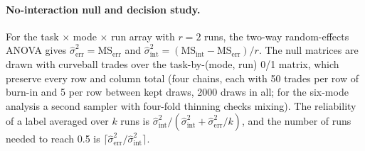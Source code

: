 \paragraph{No-interaction null and decision study.} For the task $\times$ mode $\times$ run array with $r=2$ runs, the two-way random-effects ANOVA gives $\hat\sigma^2_{\text{err}} = \mathrm{MS}_{\text{err}}$ and $\hat\sigma^2_{\text{int}} = (\mathrm{MS}_{\text{int}} - \mathrm{MS}_{\text{err}})/r$. The null matrices are drawn with curveball trades over the task-by-(mode, run) 0/1 matrix, which preserve every row and column total (four chains, each with 50 trades per row of burn-in and 5 per row between kept draws, 2000 draws in all; for the six-mode analysis a second sampler with four-fold thinning checks mixing). The reliability of a label averaged over $k$ runs is $\hat\sigma^2_{\text{int}}/(\hat\sigma^2_{\text{int}} + \hat\sigma^2_{\text{err}}/k)$, and the number of runs needed to reach 0.5 is $\lceil \hat\sigma^2_{\text{err}}/\hat\sigma^2_{\text{int}} \rceil$.


